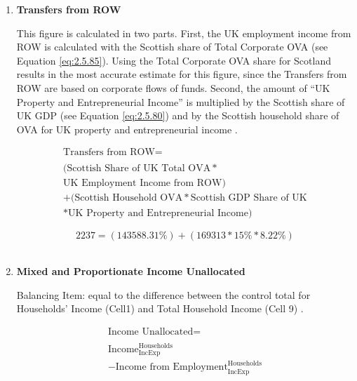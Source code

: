 \begin{enumerate}
\newpage

\item \textbf {Transfers from ROW}

This figure is calculated in two parts. First, the UK employment income from ROW \cite{ONS2011c} is calculated with the Scottish share of Total Corporate OVA (see Equation \ref{eq:2.5.85}). Using the Total Corporate OVA share for Scotland results in the most accurate estimate for this figure, since the Transfers from ROW are based on corporate flows of funds. Second, the amount of ``UK Property and Entrepreneurial Income'' is multiplied by the Scottish share of UK GDP (see Equation \ref{eq:2.5.80}) and by the Scottish household share of OVA for UK property and entrepreneurial income \cite{ScotGov2013a,ScotGov2013b}.

\begin{equation}
\begin{split}
\text{Transfers from ROW} =  \\ \\
(\text{Scottish Share of UK Total OVA}*\\
\text{UK Employment Income from ROW})\\
+(\text{Scottish Household OVA}*\text{Scottish GDP Share of UK}\\
*\text{UK Property and Entrepreneurial Income})
\end{split} \label{eq:2.5.11}
\end{equation}


\begin{equation} \nonumber
2237 = (143588.31\%)+(169313*15\%*8.22\%)
\end{equation}\\


\item \textbf {Mixed and Proportionate Income Unallocated}

Balancing Item: equal to the difference between the control total for Households' Income (Cell1) and Total Household Income (Cell 9) \cite{ONS2012}.

\begin{equation}
\begin{split}
\text{Income Unallocated} =  \\ \\
\text{Income}^\text{Households}_\text{IncExp}\\
-\text{Income from Employment}^\text{Households}_\text{IncExp}
\end{split} \label{eq:2.5.12}
\end{equation}



\end{enumerate}
